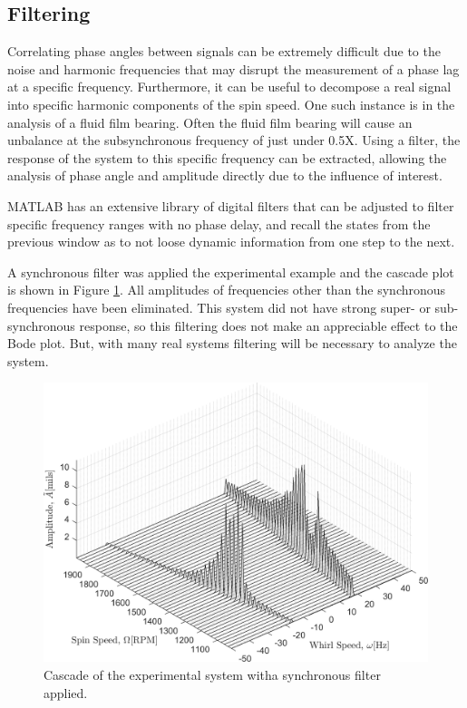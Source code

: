 \subsection{Filtering}
Correlating phase angles between signals can be extremely difficult due to the noise and harmonic frequencies that may disrupt the measurement of a phase lag at a specific frequency. Furthermore, it can be useful to decompose a real signal into specific harmonic components of the spin speed. One such instance is in the analysis of a fluid film bearing. Often the fluid film bearing will cause an unbalance at the subsynchronous frequency of just under 0.5X. Using a filter, the response of the system to this specific frequency can be extracted, allowing the analysis of phase angle and amplitude directly due to the influence of interest.\par 
MATLAB has an extensive library of digital filters that can be adjusted to filter specific frequency ranges with no phase delay, and recall the states from the previous window as to not loose dynamic information from one step to the next.\par 
A synchronous filter was applied the experimental example and the cascade plot is shown in Figure \ref{fig:ExpExampleCascade2}. All amplitudes of frequencies other than the synchronous frequencies have been eliminated. This system did not have strong super- or sub-synchronous response, so this filtering does not make an appreciable effect to the Bode plot. But, with many real systems filtering will be necessary to analyze the system.
\begin{figure}
	\centering
	\includegraphics[width=\linewidth]{./figures/ExpExampleCascadeFilt.png}
	\caption{Cascade of the experimental system witha synchronous filter applied.}
	\label{fig:ExpExampleCascade2}
\end{figure}